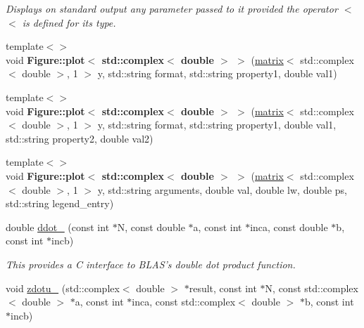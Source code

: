 \begin{DoxyCompactItemize}
\begin{DoxyCompactList}\small\item\em Displays on standard output any parameter passed to it provided the operator $<$$<$ is defined for its type. \end{DoxyCompactList}\item 
\hypertarget{namespacekeycpp_a90b60f7fefe3931699f4d587a241c12e}{{\footnotesize template$<$$>$ }\\void {\bfseries Figure\-::plot$<$ std\-::complex$<$ double $>$ $>$} (\hyperlink{classkeycpp_1_1matrix}{matrix}$<$ std\-::complex$<$ double $>$, 1 $>$ y, std\-::string format, std\-::string property1, double val1)}\label{namespacekeycpp_a90b60f7fefe3931699f4d587a241c12e}

\item 
\hypertarget{namespacekeycpp_a83249f0263926905c67d2a177495eef8}{{\footnotesize template$<$$>$ }\\void {\bfseries Figure\-::plot$<$ std\-::complex$<$ double $>$ $>$} (\hyperlink{classkeycpp_1_1matrix}{matrix}$<$ std\-::complex$<$ double $>$, 1 $>$ y, std\-::string format, std\-::string property1, double val1, std\-::string property2, double val2)}\label{namespacekeycpp_a83249f0263926905c67d2a177495eef8}

\item 
\hypertarget{namespacekeycpp_a7368f9a35fb8dbc5c29420fb9677ea30}{{\footnotesize template$<$$>$ }\\void {\bfseries Figure\-::plot$<$ std\-::complex$<$ double $>$ $>$} (\hyperlink{classkeycpp_1_1matrix}{matrix}$<$ std\-::complex$<$ double $>$, 1 $>$ y, std\-::string arguments, double val, double lw, double ps, std\-::string legend\-\_\-entry)}\label{namespacekeycpp_a7368f9a35fb8dbc5c29420fb9677ea30}

\item 
\hypertarget{namespacekeycpp_a55e50932cc54f92bdd7e38c6438f4f1f}{double \hyperlink{namespacekeycpp_a55e50932cc54f92bdd7e38c6438f4f1f}{ddot\-\_\-} (const int $\ast$N, const double $\ast$a, const int $\ast$inca, const double $\ast$b, const int $\ast$incb)}\label{namespacekeycpp_a55e50932cc54f92bdd7e38c6438f4f1f}

\begin{DoxyCompactList}\small\item\em This provides a C interface to B\-L\-A\-S's double dot product function. \end{DoxyCompactList}\item 
\hypertarget{namespacekeycpp_a2ce99b4fe4a13b9c70ada81761eb0ca2}{void \hyperlink{namespacekeycpp_a2ce99b4fe4a13b9c70ada81761eb0ca2}{zdotu\-\_\-} (std\-::complex$<$ double $>$ $\ast$result, const int $\ast$N, const std\-::complex$<$ double $>$ $\ast$a, const int $\ast$inca, const std\-::complex$<$ double $>$ $\ast$b, const int $\ast$incb)}\label{namespacekeycpp_a2ce99b4fe4a13b9c70ada81761eb0ca2}


\end{DoxyCompactItemize}
